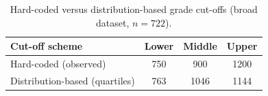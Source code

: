 \begin{table}[t]
  \centering
  \caption{Hard-coded versus distribution-based grade cut-offs
           (broad dataset, $n=722$).}
  \label{tab:cutoff}
  \begin{tabular}{@{}lccc@{}}
    \toprule
    Cut-off scheme & Lower & Middle & Upper \\
    \midrule
    Hard-coded (observed) & 750 & 900 & 1200 \\
    Distribution-based (quartiles) & 763 & 1046 & 1144 \\
    \bottomrule
  \end{tabular}
\end{table}
